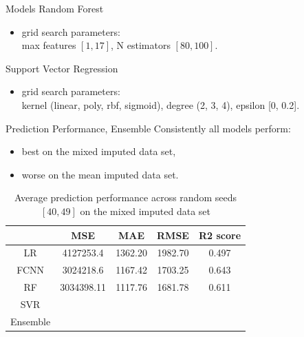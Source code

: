 \documentclass[xcolor=table]{beamer} %
\begin{document}
\begin{frame}{Models}
  \vspace{-0.5cm}
  Random Forest
  \begin{itemize}
      \item grid search parameters:\\
      max features $[1, 17]$, N estimators $[80, 100]$.
  \end{itemize}
  Support Vector Regression
  \begin{itemize}
      \item grid search parameters:\\
      kernel (linear, poly, rbf, sigmoid), degree (2, 3, 4), epsilon [0, 0.2].
  \end{itemize}
\end{frame}

\begin{frame}{Prediction Performance, Ensemble}
\vspace{-0.9cm}
 Consistently all models perform:
  \begin{itemize}
      \item best on the mixed imputed data set,
      \item worse on the mean imputed data set.
  \end{itemize}
  \begin{table}[ht!]
    \hspace{-0.7cm}
    \begin{tabular}{|c|c|c|c|c|}
        \hline
                 & MSE        & MAE     & RMSE    & R2 score\\
        \hline
        LR       & 4127253.4  & 1362.20 & 1982.70 & 0.497 \\
        FCNN     & 3024218.6  & 1167.42 & 1703.25 & 0.643 \\
        RF       & 3034398.11 & 1117.76 & 1681.78 & 0.611  \\
        SVR      &            &         &         & \\
        Ensemble &            &         &         & \\
        \hline
    \end{tabular}
    \caption{Average prediction performance across random seeds $[40, 49]$ on the mixed imputed data set}
    \label{tab:pred_perf}
\end{table}
\end{frame}
\end{document}

